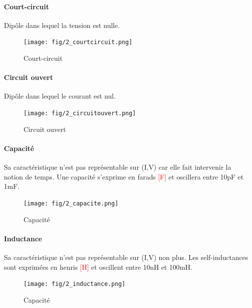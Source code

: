 \documentclass[a4paper]{article}
\begin{document}
    \paragraph{Court-circuit} Dipôle dans lequel la tension est nulle.
    \begin{figure}[H]
        \begin{center}
            \texttt{[image: fig/2\_courtcircuit.png]}
            \caption{Court-circuit}
        \end{center}
    \end{figure}

    \paragraph{Circuit ouvert} Dipôle dans lequel le courant est nul.
    \begin{figure}[H]
        \begin{center}
            \texttt{[image: fig/2\_circuitouvert.png]}
            \caption{Circuit ouvert}
        \end{center}
    \end{figure}

    \paragraph{Capacité} Sa caractéristique n'est pas représentable sur (I,V) car
    elle fait intervenir la notion de temps. Une capacité s'exprime en farads
    \textcolor{red}{[F]} et oscillera entre 10pF et 1mF.
    \begin{figure}[H]
        \begin{center}
            \texttt{[image: fig/2\_capacite.png]}
            \caption{Capacité}
        \end{center}
    \end{figure}

    \paragraph{Inductance} Sa caractéristique n'est pas représentable sur (I,V) non plus.
    Les self-inductances sont exprimées en henris \textcolor{red}{[H]} et oscillent
    entre 10nH et 100mH.
    \begin{figure}[H]
        \begin{center}
            \texttt{[image: fig/2\_inductance.png]}
            \caption{Capacité}
        \end{center}
    \end{figure}
\end{document}
